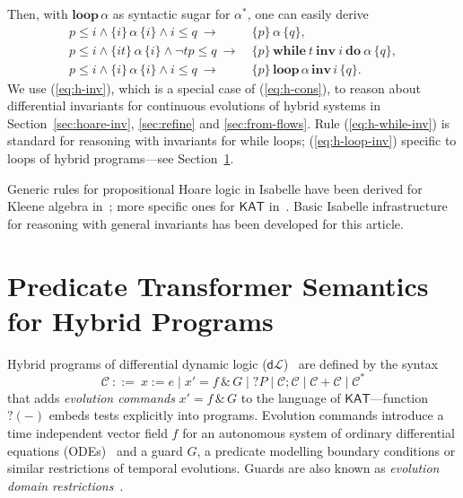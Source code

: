 \documentclass[envcountsame]{llncs}
\newcommand{\WHILEI}[3]{\mathbf{while}\ #1\ \mathbf{inv}\ #2\ \mathbf{do}\ #3}
\newcommand{\KAT}{\mathsf{KAT}}
\newcommand{\dL}{\mathsf{d}\mathcal{L}}
\newcommand\notein[3]{\todo[inline,linecolor=orange!80!black,backgroundcolor=#2!20]{#1: #3}%
}
\newcommand{\gin}[1]{\notein{{\bf GS}}{gcolor}{#1}}
\begin{document}
Then, with $\mathbf{loop}\, \alpha$ as syntactic sugar for
$\alpha^\ast$, one can easily derive
\begin{align}
  p\le i \land \{i\}\, \alpha\, \{i\}\land i\le q\ \rightarrow\
  &\{p\}\, \alpha\, \{q\},\label{eq:h-inv}\tag{h-inv}\\
  p \le i \wedge \{it\}\, \alpha\, \{i\} \wedge \neg t p\le q\
  \rightarrow \ & \{p\}\, \WHILEI{t}{i}{\alpha}\,  \{q\},\label{eq:h-while-inv}\tag{h-while-inv}\\
   p\le i \land \{i\}\, \alpha\, \{i\}\land i\le q\ \rightarrow\ &
                                                                   \{p\}\, \mathbf{loop}\, \alpha\,
    \mathbf{inv}\, i\, \{q\}. \label{eq:h-loop-inv}\tag{h-loop-inv}
\end{align}
We use (\ref{eq:h-inv}), which is a special case of (\ref{eq:h-cons}),
to reason about differential invariants for continuous evolutions of
hybrid systems in Section~\ref{sec:hoare-inv}, \ref{sec:refine} and
\ref{sec:from-flows}. Rule (\ref{eq:h-while-inv}) is standard for
reasoning with invariants for while loops; (\ref{eq:h-loop-inv})
specific to loops of hybrid programs---see
Section~\ref{sec:sta-hybrid}.

Generic rules for propositional Hoare logic in Isabelle have been
derived for Kleene algebra in~\cite{afp:ka}; more specific ones for
$\KAT$ in~\cite{afp:kat,afp:vericomp}. Basic Isabelle infrastructure for
reasoning with general invariants has been developed for this
article. 



\section{Predicate Transformer Semantics for Hybrid
  Programs}\label{sec:sta-hybrid}

\gin{Simon: add some paras on lenses.}

Hybrid programs of differential dynamic logic ($\dL$)~\cite{Platzer10} are defined by the syntax
\begin{equation*}
\mathcal{C}\ ::= \ x:=e \mid x' = f \, \&\, G \mid ?P\mid \mathcal{C};\mathcal{C}\mid \mathcal{C}+\mathcal{C}\mid \mathcal{C}^*
\end{equation*}
that adds \emph{evolution commands} $x' = f \, \&\, G$ to the language
of $\KAT$---function $?(-)$ embeds tests explicitly into programs.
Evolution commands introduce a time independent vector field $f$ for
an autonomous system of ordinary differential equations
(ODEs)~\cite{Hirsch09,Teschl12} and a guard $G$, a predicate modelling
boundary conditions or similar restrictions of temporal
evolutions. Guards are also known as \emph{evolution domain
  restrictions}~\cite{DoyenFPP18}.
\end{document}
